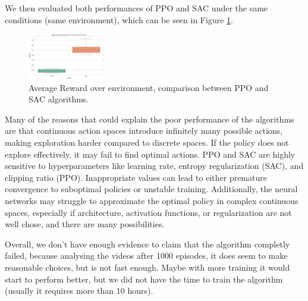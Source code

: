 \documentclass[../CSC_52081_EP.tex]{subfiles}
\begin{document}
We then evaluated both performances of PPO and SAC under the same conditions (same environment), which can be seen in Figure \ref{fig:PPO_SAC_comparison}.

\begin{figure}[H]
    \centering
    \includegraphics[width=0.3\textwidth]{figures/output_5.png}
    \caption{Average Reward over environment, comparison between PPO and SAC algorithms.}
    \label{fig:PPO_SAC_comparison}
\end{figure}

Many of the reasons that could explain the poor performance of the algorithms are that continuous action spaces introduce infinitely many possible actions, making exploration harder compared to discrete spaces. If the policy does not explore effectively, it may fail to find optimal actions.
PPO and SAC are highly sensitive to hyperparameters like learning rate, entropy regularization (SAC), and clipping ratio (PPO). Inappropriate values can lead to either premature convergence to suboptimal policies or unstable training.
Additionally, the neural networks may struggle to approximate the optimal policy in complex continuous spaces, especially if architecture, activation functions, or regularization are not well chose, and there are many possibilities.

Overall, we don't have enough evidence to claim that the algorithm completly failed, because analysing the videos after 1000 episodes, it does seem to make reasonable choices, but is not fast enough. Maybe with more training it would start to perform better, but we did not have the time to train the algorithm (usually it requires more than 10 hours).
\end{document}
